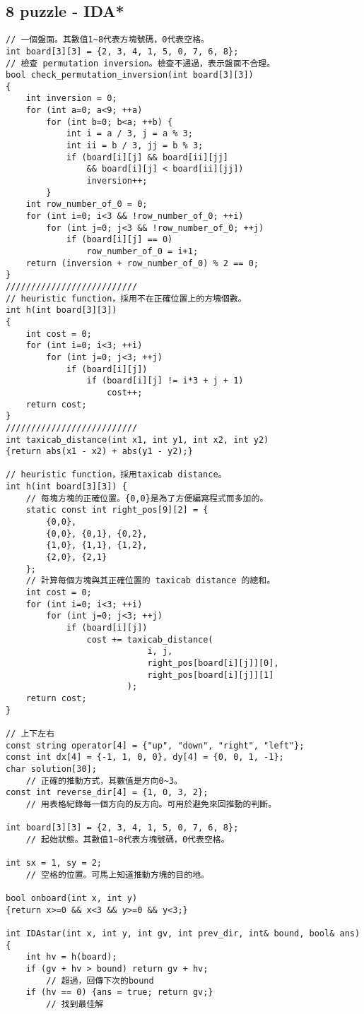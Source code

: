 \documentclass[11pt,twocolumn,a4paper]{article}
\begin{document}
\subsection{8 puzzle - IDA*}
\begin{lstlisting}[label=8 puzzle - IDA*]
// 一個盤面。其數值1~8代表方塊號碼，0代表空格。
int board[3][3] = {2, 3, 4, 1, 5, 0, 7, 6, 8};
// 檢查 permutation inversion。檢查不通過，表示盤面不合理。
bool check_permutation_inversion(int board[3][3])
{
	int inversion = 0;
	for (int a=0; a<9; ++a)
		for (int b=0; b<a; ++b) {
			int i = a / 3, j = a % 3;
			int ii = b / 3, jj = b % 3;
			if (board[i][j] && board[ii][jj]
				&& board[i][j] < board[ii][jj])
				inversion++;
		}
	int row_number_of_0 = 0;
	for (int i=0; i<3 && !row_number_of_0; ++i)
		for (int j=0; j<3 && !row_number_of_0; ++j)
			if (board[i][j] == 0)
				row_number_of_0 = i+1;
	return (inversion + row_number_of_0) % 2 == 0;
}
//////////////////////////
// heuristic function，採用不在正確位置上的方塊個數。
int h(int board[3][3])
{
	int cost = 0;
	for (int i=0; i<3; ++i)
		for (int j=0; j<3; ++j)
			if (board[i][j])
				if (board[i][j] != i*3 + j + 1)
					cost++;
	return cost;
}
//////////////////////////
int taxicab_distance(int x1, int y1, int x2, int y2)
{return abs(x1 - x2) + abs(y1 - y2);}
 
// heuristic function，採用taxicab distance。
int h(int board[3][3]) {
	// 每塊方塊的正確位置。{0,0}是為了方便編寫程式而多加的。
	static const int right_pos[9][2] = {
		{0,0},
		{0,0}, {0,1}, {0,2},
		{1,0}, {1,1}, {1,2},
		{2,0}, {2,1}
	};
	// 計算每個方塊與其正確位置的 taxicab distance 的總和。
	int cost = 0;
	for (int i=0; i<3; ++i)
		for (int j=0; j<3; ++j)
			if (board[i][j])
				cost += taxicab_distance(
							i, j,
							right_pos[board[i][j]][0],
							right_pos[board[i][j]][1]
						);
	return cost;
}

// 上下左右
const string operator[4] = {"up", "down", "right", "left"};
const int dx[4] = {-1, 1, 0, 0}, dy[4] = {0, 0, 1, -1};
char solution[30];
	// 正確的推動方式，其數值是方向0~3。
const int reverse_dir[4] = {1, 0, 3, 2};
	// 用表格紀錄每一個方向的反方向。可用於避免來回推動的判斷。

int board[3][3] = {2, 3, 4, 1, 5, 0, 7, 6, 8};
	// 起始狀態。其數值1~8代表方塊號碼，0代表空格。

int sx = 1, sy = 2;
	// 空格的位置。可馬上知道推動方塊的目的地。

bool onboard(int x, int y)
{return x>=0 && x<3 && y>=0 && y<3;}
 
int IDAstar(int x, int y, int gv, int prev_dir, int& bound, bool& ans) {
	int hv = h(board);
	if (gv + hv > bound) return gv + hv;
		// 超過，回傳下次的bound
	if (hv == 0) {ans = true; return gv;}
		// 找到最佳解
 

\end{lstlisting}
\end{document}
